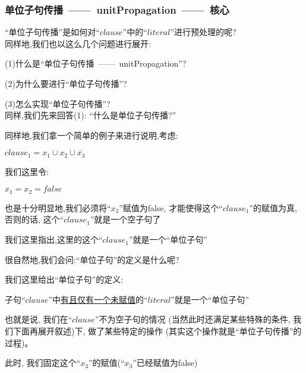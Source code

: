         \subsubsection{单位子句传播\ ——\ unitPropagation\ ——\ 核心}
        ``单位子句传播''是如何对``$clause$''中的``$literal$''进行预处理的呢?
        \\
        \noindent
        \newline
        同样地,我们也以这么几个问题进行展开:\\
            \par
            (1)什么是``单位子句传播\ ——\ unitPropagation''?\par
            (2)为什么要进行``单位子句传播''?\par
            (3)怎么实现``单位子句传播''?\\
        \noindent
        \newline
        同样,我们先来回答(1):   ``什么是单位子句传播?''\\
        \par
        同样地,我们拿一个简单的例子来进行说明,考虑:
        \begin{center}
            $clause_{1} = x_{1} \cup x_{2} \cup \overline{x_{3}}$
        \end{center}
        \par
        我们这里令:
        \begin{center}
            $x_{1}=x_{2}=false$
        \end{center}
        \par
        也是十分明显地,我们必须将``$x_{3}$''赋值为false,
        才能使得这个``$clause_{1}$''的赋值为真,
        否则的话,
        这个``$clause_{1}$''就是一个空子句了
        \par
        我们这里指出,这里的这个``$clause_{1}$''就是一个``单位子句''
        \par
        很自然地,我们会问:``单位子句''的定义是什么呢?
        \par
        我们这里给出``单位子句''的定义:
        \par
        子句``$clause$''中\underline{有且仅有一个未赋值}的``$literal$''就是一个``单位子句''
        \par
        也就是说,
        我们在``$clause$''不为空子句的情况
        (当然此时还满足某些特殊的条件,
        我们下面再展开叙述)下,
        做了某些特定的操作
        (其实这个操作就是``单位子句传播''的过程)。
        \par
        此时,
        我们固定这个``$x_{3}$''的赋值(``$x_{3}$''已经赋值为false)
